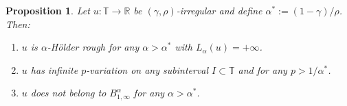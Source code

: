 \documentclass[11pt,oneside,reqno]{amsart}
\newcommand{\assign}{:=}
\newenvironment{enumeratealpha}{\begin{enumerate}[a{\textup{)}}] }{\end{enumerate}}
\newtheorem{proposition}[theorem]{Proposition}
{\theoremstyle{remark}\newtheorem{remark}[theorem]{Remark}}
\numberwithin{equation}{section}
\begin{document}
\begin{proposition}
  \label{prop:rho-irr-besov-nikolskii}Let $u : \mathbb{T} \rightarrow
  \mathbb{R}$ be $(\gamma, \rho)$-irregular and define $\alpha^{\ast} \assign
  (1 - \gamma) / \rho$. Then:
  \begin{enumeratealpha}
    \item $u$ is $\alpha$-H\"{o}lder rough for any $\alpha > \alpha^{\ast}$
    with $L_{\alpha} (u) = + \infty$.
    
    \item $u$ has infinite $p$-variation on any subinterval $I \subset
    \mathbb{T}$ and for any $p > 1 / \alpha^{\ast}$.
    
    \item $u$ does not belong to $B^{\alpha}_{1, \infty}$ for
    any $\alpha > \alpha^{\ast}$.
  \end{enumeratealpha}
\end{proposition}
\end{document}
